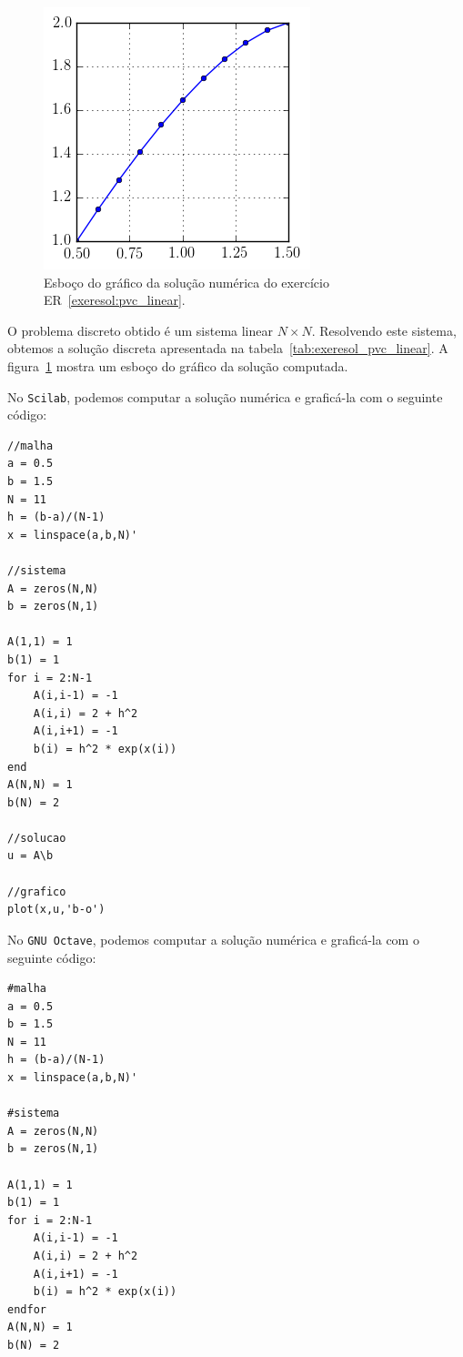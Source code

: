 \begin{resol}
\begin{figure}
  \centering
  \includegraphics{./cap_pvc/pics/exeresol_pvc_linear/exeresol_pvc_linear}
  \caption{Esboço do gráfico da solução numérica do exercício ER~\ref{exeresol:pvc_linear}.}
  \label{fig:exeresol_pvc_linear}
\end{figure}

O problema discreto obtido é um sistema linear $N\times N$. Resolvendo este sistema, obtemos a solução discreta apresentada na tabela~\ref{tab:exeresol_pvc_linear}. A figura~\ref{fig:exeresol_pvc_linear} mostra um esboço do gráfico da solução computada.

\ifisscilab
No \verb+Scilab+, podemos computar a solução numérica e graficá-la com o seguinte código:
\begin{verbatim}
//malha
a = 0.5
b = 1.5
N = 11
h = (b-a)/(N-1)
x = linspace(a,b,N)'

//sistema
A = zeros(N,N)
b = zeros(N,1)

A(1,1) = 1
b(1) = 1
for i = 2:N-1
    A(i,i-1) = -1
    A(i,i) = 2 + h^2
    A(i,i+1) = -1
    b(i) = h^2 * exp(x(i))
end
A(N,N) = 1
b(N) = 2

//solucao
u = A\b

//grafico
plot(x,u,'b-o')
\end{verbatim}
\fi
\ifisoctave
No \verb+GNU Octave+, podemos computar a solução numérica e graficá-la com o seguinte código:
\begin{verbatim}
#malha
a = 0.5
b = 1.5
N = 11
h = (b-a)/(N-1)
x = linspace(a,b,N)'

#sistema
A = zeros(N,N)
b = zeros(N,1)

A(1,1) = 1
b(1) = 1
for i = 2:N-1
    A(i,i-1) = -1
    A(i,i) = 2 + h^2
    A(i,i+1) = -1
    b(i) = h^2 * exp(x(i))
endfor
A(N,N) = 1
b(N) = 2


\end{verbatim}
\end{resol}
